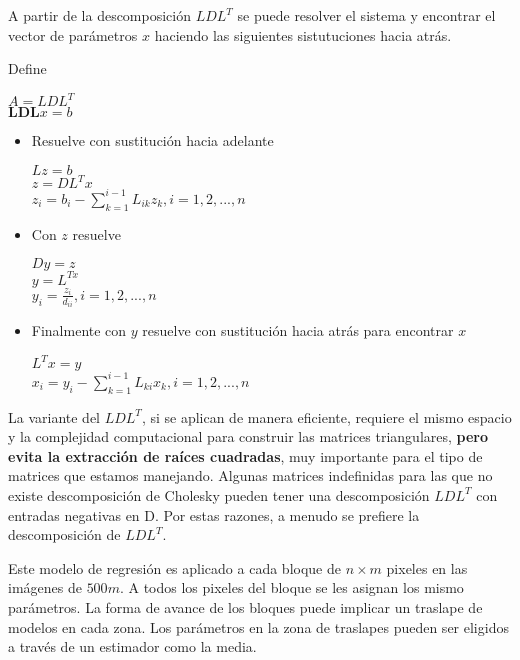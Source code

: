 {A partir de la descomposición $LDL^{T}$ se puede resolver el sistema y encontrar el vector de parámetros $x$ haciendo las siguientes sistutuciones hacia atrás. 

Define 

\begin{center}
$A = LDL^{T}$ \\
$\mathbf{LDL}x = b$
\end{center}

\begin{itemize}
\item Resuelve con sustitución hacia adelante
\begin{center}
$Lz = b$\\
$z = DL^{T}x$\\
$z_{i} = b_{i} - \sum_{k=1}^{i-1}L_{ik}z_{k}, i=1,2,...,n$
\end{center}
\item Con $z$ resuelve
\begin{center}
$Dy = z$\\
$y = L^{Tx}$\\
$y_{i} = \frac{z_{i}}{d_{ii}}, i=1,2,...,n$
\end{center}
\item Finalmente con $y$ resuelve con sustitución hacia atrás para encontrar $x$
\begin{center}
$L^{T}x = y$\\
$x_{i} = y_{i} - \sum_{k=1}^{i-1}L_{ki}x_{k}, i=1,2,...,n$
\end{center}
\end{itemize}

La variante del $LDL^{T}$, si se aplican de manera eficiente, requiere el mismo espacio y la complejidad computacional para construir las matrices triangulares, \textbf{pero evita la extracción de raíces cuadradas}, muy importante para el tipo de matrices que estamos manejando. Algunas matrices indefinidas para las que no existe descomposición de Cholesky pueden tener una descomposición $LDL^{T}$ con entradas negativas en D. Por estas razones, a menudo se prefiere la descomposición de $LDL^{T}$. }%

Este modelo de regresión es aplicado a cada bloque de $n \times m$ pixeles en las imágenes de $500m$. A todos los pixeles del bloque se les asignan los mismo parámetros. La forma de avance de los bloques puede implicar un traslape de modelos en cada zona. Los parámetros en la zona de traslapes pueden ser eligidos a través de un estimador como la media.

